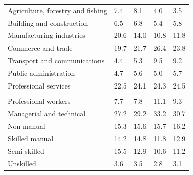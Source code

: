 \documentclass{article}
\begin{document}
\begin{table}[h]
\begin{tabular}{KTTTT}
    \hline
Agriculture, forestry and fishing  & 7.4& 8.1& 4.0& 3.5\\
Building and construction & 6.5& 6.8& 5.4& 5.8\\
Manufacturing industries & 20.6& 14.0& 10.8& 11.8\\
Commerce and trade  & 19.7& 21.7& 26.4& 23.8\\
Transport and communications  & 4.4& 5.3& 9.5& 9.2\\
Public administration & 4.7& 5.6& 5.0& 5.7\\
Professional services & 22.5& 24.1& 24.3& 24.5\\
\hline
    \\ 
    \hline
Professional workers  &  7.7&  7.8 & 11.1&  9.3\\
Managerial and technical & 27.2& 29.2& 33.2& 30.7\\
Non-manual & 15.3& 15.6& 15.7& 16.2\\
Skilled manual & 14.2& 14.8& 11.8& 12.9\\
Semi-skilled & 15.5& 12.9& 10.6& 11.2\\
Unskilled  & 3.6& 3.5& 2.8& 3.1\\
\end{tabular}
\end{table}
\pagebreak
\end{document}
